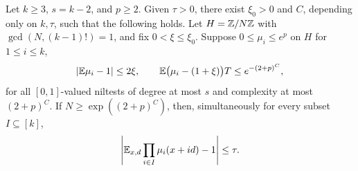 \begin{proposition}
\label{counting:positive}
Let $k\geq3$, $s=k-2$, and $p\geq2$.  Given $\tau>0$, there exist $\xi_0>0$ and $C$,
depending only on $k,\tau$, such that the following holds. Let
$H=\mathbb Z/N\mathbb Z$ with $\gcd(N,(k-1)!)=1$, and fix
$0<\xi\leq\xi_0$. Suppose $0\leq\mu_i\leq e^p$ on $H$
for $1\leq i\leq k$,
\[
 |\mathbb E\mu_i-1|\leq2\xi,\qquad
 \mathbb E\bigl(\mu_i-(1+\xi)\bigr)T\leq e^{-(2+p)^C},
\]
for all $[0,1]$-valued niltests of degree at most $s$ and complexity
at most $(2+p)^C$.  If
$N\geq\exp((2+p)^C)$, then, simultaneously for every subset $I\subseteq[k]$,
\begin{equation}\label{counting:ap-count}
 \left|\mathbb E_{x,d}\prod_{i\in I}\mu_i(x+id)-1\right|\leq\tau.
\end{equation}
\end{proposition}

